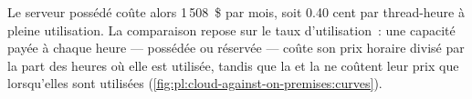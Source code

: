 \label{lst:pl:cloud-against-on-premises:owned}

Le serveur possédé coûte alors 1\,508~\$ par mois, soit 0.40 cent par thread-heure à pleine utilisation. La comparaison repose sur le taux d'utilisation~: une capacité
payée à chaque heure --- possédée ou réservée --- coûte son prix horaire divisé par la part des heures où elle est utilisée, tandis que la  et la 
ne coûtent leur prix que lorsqu'elles sont utilisées (\cref{fig:pl:cloud-against-on-premises:curves}).

